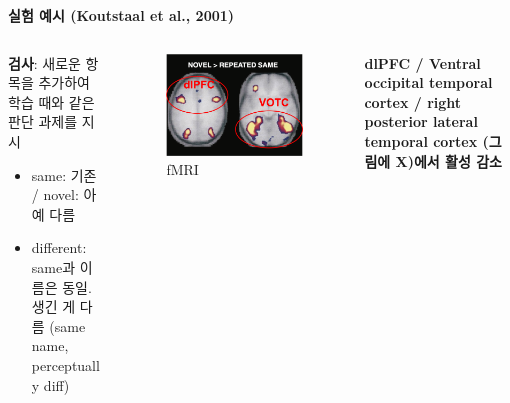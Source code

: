 \documentclass{beamer}
\begin{document}
\begin{frame}{\textbf{실험 예시 (Koutstaal et al., 2001)}}
\begin{columns}
\begin{column}{0.4\textwidth}
      \textbf{검사}: 새로운 항목을 추가하여 학습 때와 같은 판단 과제를 지시
      \vspace{-0.5em}
      \begin{itemize}
        \setlength{\itemsep}{0em}
        \setlength{\parskip}{0em}
        \item same: 기존 / novel: 아예 다름
        \item different: same과 이름은 동일. 생긴 게 다름 (same name, perceptually diff)
      \end{itemize}
    \end{column}
    \hfill
    \begin{column}{0.58\textwidth}
      \begin{columns}
        \begin{column}{0.55\textwidth}
          \begin{figure}
            \centering
            \includegraphics[width=\textwidth]{image/Koutstaal_fmri}
            \caption{fMRI}
          \end{figure}
        \end{column}
        \begin{column}{0.45\textwidth}
          \textbf{dlPFC / Ventral occipital temporal cortex / right posterior lateral temporal cortex (그림에 X)에서 활성 감소}
        \end{column}
      \end{columns}
      \vspace{-1em}
      \begin{columns}
        \begin{column}{0.6\textwidth}
          \begin{figure}

\end{figure}
\end{column}
\end{columns}
\end{column}
\end{columns}
\end{frame}
\end{document}
